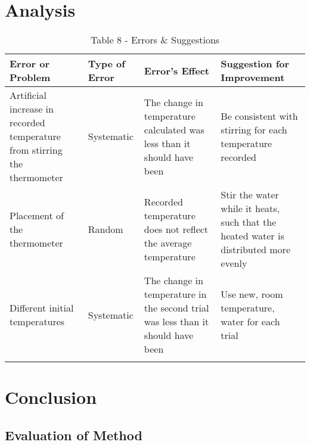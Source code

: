\documentclass{lab}
\begin{document}
	\section{Analysis}

	\noindent\begin{minipage}{\textwidth}
    \vspace{-0.2cm}
	\renewcommand{\arraystretch}{1.1}
        \begin{table}[H]
            \centering
            \begin{tabular}{L{1.445in}|L{1.445in}|L{1.445in}|L{1.445in}}
            \dtoprule
            \textbf{Error or Problem}    & \textbf{Type of Error}    & \textbf{Error's Effect}    & \textbf{Suggestion for Improvement}\\
            \hline
            Artificial increase in recorded temperature from stirring the thermometer & Systematic & The change in temperature calculated was less than it should have been & Be consistent with stirring for each temperature recorded \\
            \hline
            Placement of the thermometer & Random & Recorded temperature does not reflect the average temperature & Stir the water while it heats, such that the heated water is distributed more evenly \\
            \hline
            Different initial temperatures & Systematic & The change in temperature in the second trial was less than it should have been & Use new, room temperature, water for each trial \\
            \dbottomrule
        \end{tabular}
	\caption{Table 8 - Errors \& Suggestions}
	\label{table: errors}
	\end{table}
	\end{minipage}

	\section{Conclusion}

	\subsection{Evaluation of Method}

	\newpage
	\setcounter{page}{1}
	\listoftables
\end{document}
